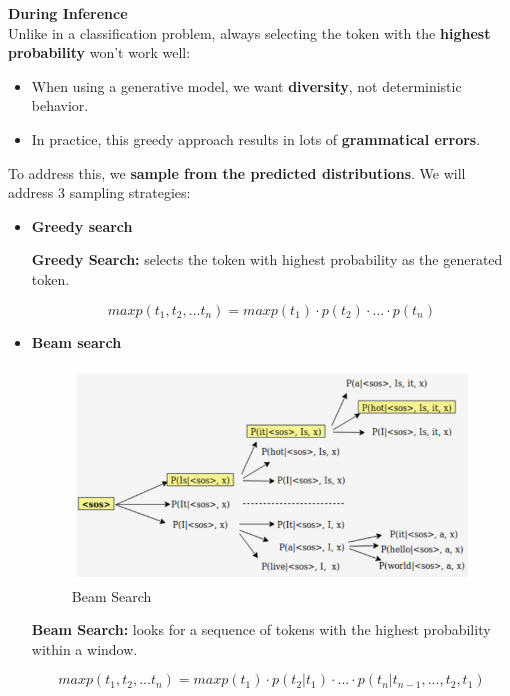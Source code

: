 \noindent \textbf{During Inference} \\

Unlike in a classification problem, always selecting the token with the \textbf{highest probability} won't work well:
\begin{itemize}
    \item When using a generative model, we want \textbf{diversity}, not deterministic behavior.
    \item In practice, this greedy approach results in lots of \textbf{grammatical errors}.
\end{itemize}

To address this, we \textbf{sample from the predicted distributions}. We will address 3 sampling strategies:
\begin{itemize}
    \item \textbf{Greedy search}

\begin{definition}
    \textbf{Greedy Search:}  selects the token with highest probability as the generated token.

\[ maxp(t_1, t_2,...t_n) = maxp(t_1) \cdot p(t_2) \cdot ... \cdot p(t_n) \]

\end{definition}

    \item \textbf{Beam search}

\begin{figure}[h!t]
    \centering
    \includegraphics[width=0.75\linewidth]{beamsearch.png}
    \caption{Beam Search}
    \label{fig:enter-label}
\end{figure}

\begin{definition}
    \textbf{Beam Search:} looks for a sequence of tokens with the highest probability within a
window.

\[ maxp(t_1, t_2,...t_n) = maxp(t_1) \cdot p(t_2 | t_1) \cdot ... \cdot p(t_n|t_{n-1}, ..., t_2,t_1) \]


\end{definition}
\end{itemize}
